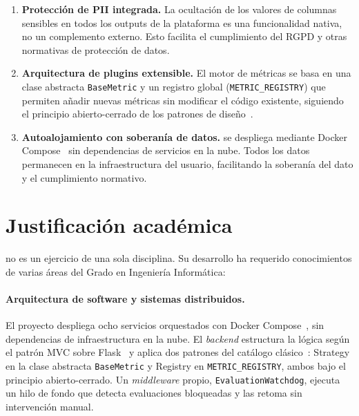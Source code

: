 \begin{enumerate}
  \item \textbf{Protección de \ac{PII} integrada.} La ocultación de los
    valores de columnas sensibles en todos los outputs de la plataforma es
    una funcionalidad nativa, no un complemento externo. Esto facilita el
    cumplimiento del \ac{RGPD} y otras normativas de protección de datos.

  \item \textbf{Arquitectura de plugins extensible.} El motor de métricas se
    basa en una clase abstracta \texttt{BaseMetric} y un registro global
    (\texttt{METRIC\_REGISTRY}) que permiten añadir nuevas métricas sin
    modificar el código existente, siguiendo el principio abierto-cerrado
    de los patrones de diseño~\citep{design_patterns}.

  \item \textbf{Autoalojamiento con soberanía de datos.} \dataqual se despliega
    mediante Docker Compose~\citep{docker} sin dependencias de servicios
    en la nube. Todos los datos permanecen en la infraestructura del usuario,
    facilitando la soberanía del dato y el cumplimiento normativo.
\end{enumerate}


\section{Justificación académica}
\label{sec:justificacion-academica}

\dataqual no es un ejercicio de una sola disciplina.  Su desarrollo ha
requerido conocimientos de varias áreas del Grado en Ingeniería Informática:

\paragraph{Arquitectura de software y sistemas distribuidos.}
El proyecto despliega ocho servicios orquestados con Docker
Compose~\citep{docker}, sin dependencias de infraestructura en la nube.
El \emph{backend} estructura la lógica según el patrón \ac{MVC} sobre
Flask~\citep{flask} y aplica dos patrones del catálogo clásico~\citep{design_patterns}:
Strategy en la clase abstracta \texttt{BaseMetric} y Registry en
\texttt{METRIC\_REGISTRY}, ambos bajo el principio abierto-cerrado.
Un \emph{middleware} propio, \texttt{EvaluationWatchdog}, ejecuta un hilo
de fondo que detecta evaluaciones bloqueadas y las retoma sin intervención
manual.

